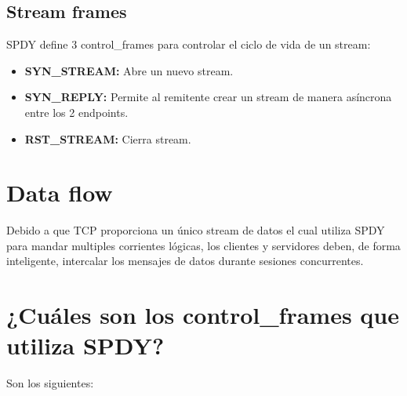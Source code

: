 \subsection{Stream frames}
SPDY define 3 control\_frames para controlar el ciclo de vida de un stream:
\begin{itemize}
\item \textbf{SYN\_STREAM:} Abre un nuevo stream.
\item \textbf{SYN\_REPLY:} Permite al remitente crear un stream de manera asíncrona entre los 2 endpoints.
\item \textbf{RST\_STREAM:} Cierra stream.
\end{itemize}

\section{Data flow}
Debido a que TCP proporciona un único stream de datos el cual utiliza SPDY para mandar multiples corrientes lógicas, los clientes y servidores deben, de forma inteligente, intercalar los mensajes de datos durante sesiones concurrentes.
\section{¿Cuáles son los control\_frames que utiliza SPDY?}
Son los siguientes:
